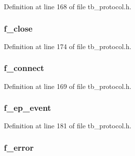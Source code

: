 Definition at line 168 of file tb\-\_\-protocol.\-h.

\hypertarget{structtb__protocol__t_afba2de073f269f760d4bb0197f201883}{
\subsubsection[{f\-\_\-close}]{ f\-\_\-close}}\label{structtb__protocol__t_afba2de073f269f760d4bb0197f201883}


Definition at line 174 of file tb\-\_\-protocol.\-h.

\hypertarget{structtb__protocol__t_a7d0f95f7e269f99385844c48a75f6532}{
\subsubsection[{f\-\_\-connect}]{ f\-\_\-connect}}\label{structtb__protocol__t_a7d0f95f7e269f99385844c48a75f6532}


Definition at line 169 of file tb\-\_\-protocol.\-h.

\hypertarget{structtb__protocol__t_a8e1a53ac67fc143d7e7fa50e20ea641f}{
\subsubsection[{f\-\_\-ep\-\_\-event}]{ f\-\_\-ep\-\_\-event}}\label{structtb__protocol__t_a8e1a53ac67fc143d7e7fa50e20ea641f}


Definition at line 181 of file tb\-\_\-protocol.\-h.

\hypertarget{structtb__protocol__t_a5b3fef362953f92e9a750e44cf292b30}{
\subsubsection[{f\-\_\-error}]{ f\-\_\-error}}\label{structtb__protocol__t_a5b3fef362953f92e9a750e44cf292b30}


